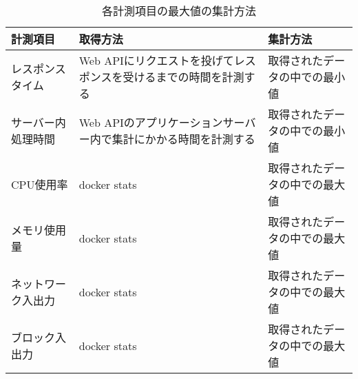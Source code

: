 \documentclass[../../../../main]{subfiles}
\begin{document}
    \begin{table}[htbp]
        \centering
        \caption{各計測項目の最大値の集計方法}
        \label{tab:max-aggregation-method}
        \begin{tabular}{|l|p{6cm}|l|}
            \hline
            \textbf{計測項目} & \textbf{取得方法}                        & \textbf{集計方法}   \\ \hline
            レスポンスタイム      & Web APIにリクエストを投げてレスポンスを受けるまでの時間を計測する & 取得されたデータの中での最小値 \\ \hline
            サーバー内処理時間     & Web APIのアプリケーションサーバー内で集計にかかる時間を計測する  & 取得されたデータの中での最小値 \\ \hline
            CPU使用率        & docker stats                         & 取得されたデータの中での最大値 \\ \hline
            メモリ使用量        & docker stats                         & 取得されたデータの中での最大値 \\ \hline
            ネットワーク入出力     & docker stats                         & 取得されたデータの中での最大値 \\ \hline
            ブロック入出力       & docker stats                         & 取得されたデータの中での最大値 \\ \hline
        \end{tabular}
    \end{table}
\end{document}
